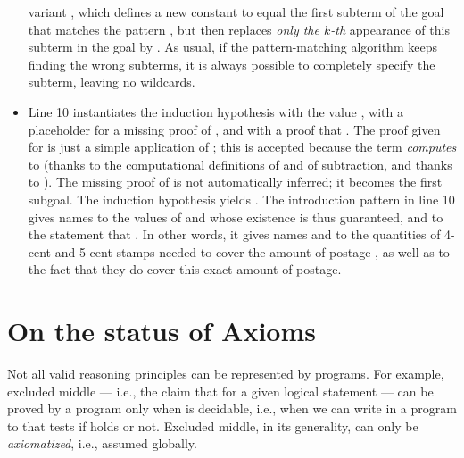 \begin{itemize}
variant , which defines a new constant
 to equal the first subterm of the goal that matches the pattern
, but then replaces \emph{only the \(k\)-th} appearance
of this subterm in the goal by . As usual, if the
pattern-matching algorithm keeps finding the wrong subterms, it is
always possible to completely specify the subterm, leaving no
wildcards.
\item Line 10 instantiates the induction hypothesis with the value
, with a placeholder for a missing proof of ,
and with a proof that . The proof given for
 is just a simple application of ; this is
accepted because the term  \emph{computes} to
 (thanks to the computational definitions of \C{<} and of
subtraction, and thanks to ). The missing proof
of  is not automatically inferred; it becomes the first
subgoal. The induction hypothesis yields
. The introduction
pattern in line 10 gives names to the values of  and 
whose existence is thus guaranteed, and to the statement that
. In other words, it gives names  and
 to the quantities of 4-cent and 5-cent stamps needed to cover
the amount of postage , as well as to the fact that they do
cover this exact amount of postage.
\end{itemize}


\section{On the status of Axioms}
\label{sec:EM}

Not all valid reasoning principles can be represented by programs.
For example, excluded middle --- i.e., the claim that
 for a given logical statement  ---
can be proved by a program only when
 is decidable, i.e., when we can write in \Coq{} a program
to  that tests if  holds or not.
Excluded middle, in its generality, can only be \emph{axiomatized},
i.e., assumed globally.

